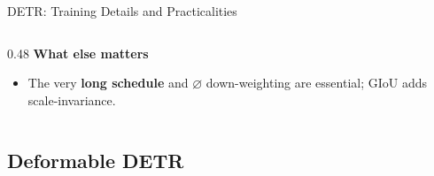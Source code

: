 \begin{frame}{DETR: Training Details and Practicalities}
\begin{columns}[T]
\begin{column}{0.48\textwidth}
      \vspace{0.2em}
      \textbf{What else matters}
      \begin{itemize}
        \item The very \textbf{long schedule} and $\varnothing$ down-weighting are essential; GIoU adds scale-invariance.
      \end{itemize}
    \end{column}
  \end{columns}
\end{frame}

\subsection{Deformable DETR}

